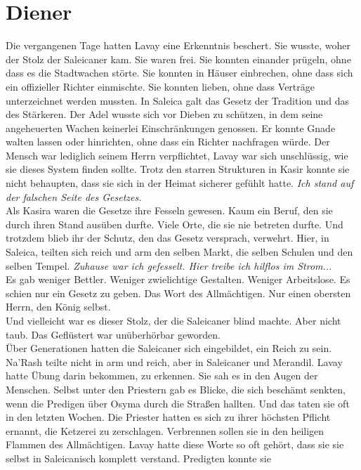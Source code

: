 \chapter{Diener}

Die vergangenen Tage hatten Lavay eine Erkenntnis beschert. Sie wusste, woher der Stolz der 
Saleicaner kam. Sie waren frei. Sie konnten einander prügeln, ohne dass es die Stadtwachen störte. 
Sie konnten in Häuser einbrechen, ohne dass sich ein offizieller Richter einmischte. Sie konnten 
lieben, ohne dass Verträge unterzeichnet werden mussten. In Saleica galt das Gesetz der Tradition 
und das des Stärkeren. Der Adel wusste sich vor Dieben zu schützen, in dem seine angeheuerten 
Wachen keinerlei Einschränkungen genossen. Er konnte Gnade walten lassen oder hinrichten, ohne dass 
ein Richter nachfragen würde. Der Mensch war lediglich seinem Herrn verpflichtet, 
Lavay war sich unschlüssig, wie sie dieses System finden sollte. 
Trotz den starren Strukturen in Kasir konnte sie nicht behaupten, dass sie sich in der Heimat 
sicherer gefühlt hatte. \textit{Ich stand auf der falschen Seite des Gesetzes.}\\
Als Kasira waren die Gesetze ihre Fesseln gewesen. Kaum ein Beruf, den sie durch ihren Stand 
ausüben durfte. Viele Orte, die sie nie betreten durfte. Und trotzdem blieb ihr der Schutz, den das 
Gesetz versprach, verwehrt. Hier, in Saleica, teilten sich reich und arm den selben Markt, die 
selben Schulen und den selben Tempel. \textit{Zuhause war ich gefesselt. Hier treibe ich hilflos im 
Strom...}\\
Es gab weniger Bettler. Weniger zwielichtige Gestalten. Weniger Arbeitslose. Es schien nur ein 
Gesetz zu geben. Das Wort des Allmächtigen. Nur einen obersten Herrn, den König selbst.\\
Und vielleicht war es dieser Stolz, der die Saleicaner blind machte. Aber nicht taub. Das 
Geflüstert war unüberhörbar geworden.\\
Über Generationen hatten die Saleicaner sich eingebildet, ein Reich zu sein. Na'Rash teilte nicht 
in arm und reich, aber in Saleicaner und Merandil. Lavay hatte Übung darin bekommen, zu erkennen. 
Sie sah es in den Augen der Menschen. Selbst unter den Priestern gab es Blicke, die sich beschämt 
senkten, wenn die Predigen über Osyma durch die Straßen hallten. Und das taten sie oft in den 
letzten Wochen. Die Priester hatten es sich zu ihrer höchsten Pflicht ernannt, die Ketzerei zu 
zerschlagen. Verbrennen sollen sie in den heiligen Flammen des Allmächtigen. Lavay hatte diese 
Worte so oft gehört, dass sie sie selbst in Saleicanisch komplett verstand. Predigten konnte sie 
